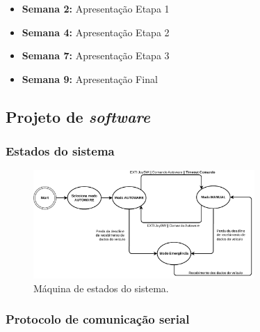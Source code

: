 \begin{itemize}
	\small
	\item \textbf{Semana 2:} Apresentação Etapa 1
	\item \textbf{Semana 4:} Apresentação Etapa 2
	\item \textbf{Semana 7:} Apresentação Etapa 3
	\item \textbf{Semana 9:} Apresentação Final
\end{itemize}


\subsection{Projeto de \textit{software}}

\subsubsection*{Estados do sistema}

\begin{figure}[H]
	\centering
	\includegraphics[width = 0.75\textwidth]{img/maquinadeestados}
	\caption{Máquina de estados do sistema.}
	\label{fig:maquinadeestados}
\end{figure}

\subsubsection*{Protocolo de comunicação serial}


